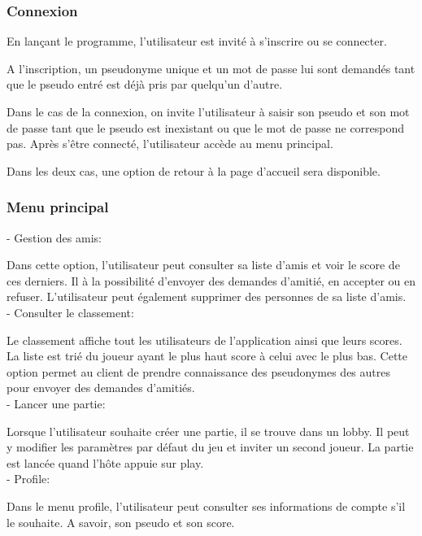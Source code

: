 \documentclass[a4paper,12pt]{article}
\begin{document}
\subsubsection{Connexion}
En lançant le programme, l'utilisateur est invité à s'inscrire ou se connecter.

A l'inscription, un pseudonyme unique et un mot de passe lui sont demandés tant que le pseudo entré est déjà pris par quelqu'un d'autre.

Dans le cas de la connexion, on invite l'utilisateur à saisir son pseudo et son mot de passe tant que le pseudo est inexistant ou que le mot de passe ne correspond pas. Après s’être connecté, l'utilisateur accède au menu principal.

Dans les deux cas, une option de retour à la page d'accueil sera disponible.

\subsubsection{Menu principal}

- Gestion des amis:

Dans cette option, l'utilisateur peut consulter sa liste d'amis et voir le score de ces derniers. Il à la possibilité d'envoyer 
des demandes d'amitié, en accepter ou en refuser. L'utilisateur peut également supprimer des personnes de sa liste d'amis.\\

- Consulter le classement:

Le classement affiche tout les utilisateurs de l'application ainsi que leurs scores. La liste est trié du joueur ayant le plus haut score à celui avec le plus bas.  
Cette option permet au client de prendre connaissance des pseudonymes des autres pour envoyer des demandes d'amitiés.\\

- Lancer une partie:

Lorsque l'utilisateur souhaite créer une partie, il se trouve dans un lobby. Il peut y modifier les paramètres par défaut du jeu et inviter un second joueur.
La partie est lancée quand l'hôte appuie sur play.\\

- Profile:

Dans le menu profile, l'utilisateur peut consulter ses informations de compte s'il le souhaite. A savoir, son pseudo et son score.
\end{document}
